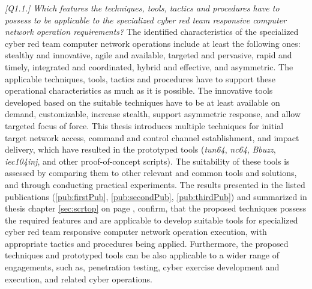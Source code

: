 \textit{[Q1.1.] Which features the techniques, tools, tactics and procedures have to possess to be applicable to the specialized cyber red team responsive computer network operation requirements?}
The identified characteristics of the specialized cyber red team computer network operations include at least the following ones: stealthy and innovative, agile and available, targeted and pervasive, rapid and timely, integrated and coordinated, hybrid and effective, and asymmetric.
The applicable techniques, tools, tactics and procedures have to support these operational characteristics as much as it is possible.
The innovative tools developed based on the suitable techniques have to be at least available on demand, customizable, increase stealth, support asymmetric response, and allow targeted focus of force. This thesis introduces multiple techniques for initial target network access, command and control channel establishment, and impact delivery, which have resulted in the prototyped tools (\textit{tun64}, \textit{nc64}, \textit{Bbuzz}, \textit{iec104inj}, and other proof-of-concept scripts). The suitability of these tools is assessed by comparing them to other relevant and common tools and solutions, and through conducting practical experiments. The results presented in the listed publications (\ref{pub:firstPub}, \ref{pub:secondPub}, \ref{pub:thirdPub}) and summarized in thesis chapter \ref{sec:scrtop} on page \pageref{sec:scrtop}, confirm, that the proposed techniques possess the required features and are applicable to develop suitable tools for specialized cyber red team responsive computer network operation execution, with appropriate tactics and procedures being applied. Furthermore, the proposed techniques and prototyped tools can be also applicable to a wider range of engagements, such as, penetration testing, cyber exercise development and execution, and related cyber operations.

